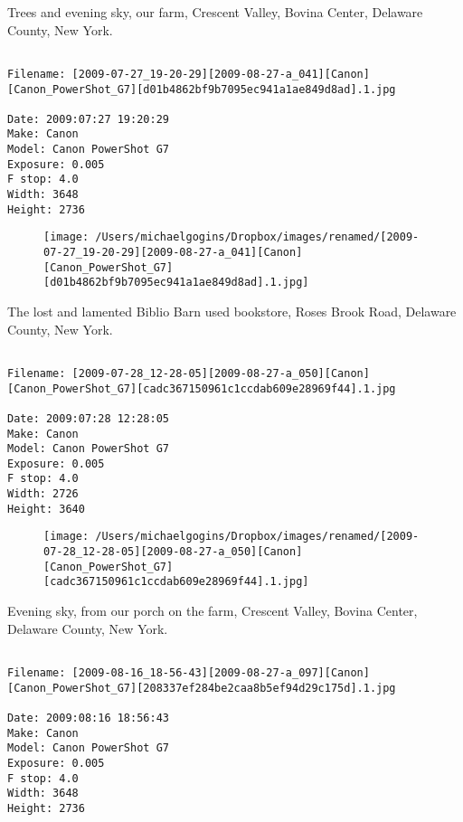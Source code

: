 \documentclass[11pt,letter,DIV=14,paper=landscape]{scrbook}
\begin{document}
\clearpage
\noindent Trees and evening sky, our farm, Crescent Valley, Bovina Center, Delaware County, New York.
\noindent
\begin{lstlisting}

Filename: [2009-07-27_19-20-29][2009-08-27-a_041][Canon][Canon_PowerShot_G7][d01b4862bf9b7095ec941a1ae849d8ad].1.jpg

Date: 2009:07:27 19:20:29
Make: Canon
Model: Canon PowerShot G7
Exposure: 0.005
F stop: 4.0
Width: 3648
Height: 2736
\end{lstlisting}
\clearpage

\begin{figure}
\texttt{[image: /Users/michaelgogins/Dropbox/images/renamed/[2009-07-27\_19-20-29][2009-08-27-a\_041][Canon][Canon\_PowerShot\_G7][d01b4862bf9b7095ec941a1ae849d8ad].1.jpg]}
\end{figure}
    
\clearpage
\noindent The lost and lamented Biblio Barn used bookstore, Roses Brook Road, Delaware County, New York.
\noindent
\begin{lstlisting}

Filename: [2009-07-28_12-28-05][2009-08-27-a_050][Canon][Canon_PowerShot_G7][cadc367150961c1ccdab609e28969f44].1.jpg

Date: 2009:07:28 12:28:05
Make: Canon
Model: Canon PowerShot G7
Exposure: 0.005
F stop: 4.0
Width: 2726
Height: 3640
\end{lstlisting}
\clearpage

\begin{figure}
\texttt{[image: /Users/michaelgogins/Dropbox/images/renamed/[2009-07-28\_12-28-05][2009-08-27-a\_050][Canon][Canon\_PowerShot\_G7][cadc367150961c1ccdab609e28969f44].1.jpg]}
\end{figure}
    
\clearpage
\noindent Evening sky, from our porch on the farm, Crescent Valley, Bovina Center, Delaware County, New York.
\noindent
\begin{lstlisting}

Filename: [2009-08-16_18-56-43][2009-08-27-a_097][Canon][Canon_PowerShot_G7][208337ef284be2caa8b5ef94d29c175d].1.jpg

Date: 2009:08:16 18:56:43
Make: Canon
Model: Canon PowerShot G7
Exposure: 0.005
F stop: 4.0
Width: 3648
Height: 2736
\end{lstlisting}
\clearpage
\end{document}
